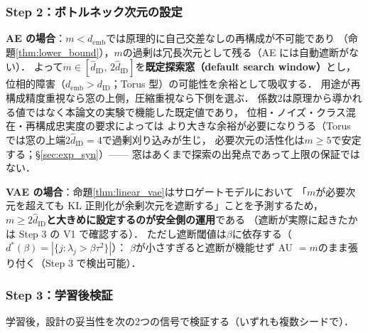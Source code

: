 \documentclass[11pt,a4paper]{jsarticle}
\newcommand{\dID}{d_{\mathrm{ID}}}
\newcommand{\hatdID}{\hat{d}_{\mathrm{ID}}}
\newcommand{\demb}{d_{\mathrm{emb}}}
\newcommand{\dstar}{d^{*}(\beta)}
\begin{document}
\subsubsection{Step 2：ボトルネック次元の設定}\label{sec:protocol_s2}

\textbf{AE の場合}：$m < \demb$では原理的に自己交差なしの再構成が不可能であり
（命題\ref{thm:lower_bound}），$m$の過剰は冗長次元として残る（AE には自動遮断がない）．
よって$m \in [\hatdID,\, 2\hatdID]$を\textbf{既定探索窓（default search window）}とし，
位相的障害（$\demb > \dID$；Torus 型）の可能性を余裕として吸収する．
用途が再構成精度重視なら窓の上側，圧縮重視なら下側を選ぶ．
係数2は原理から導かれる値ではなく本論文の実験で機能した既定値であり，
位相・ノイズ・クラス混在・再構成忠実度の要求によっては
より大きな余裕が必要になりうる（Torus では窓の上端$2\hatdID = 4$で過剰刈り込みが生じ，
必要次元の活性化は$m \geq 5$で安定する；§\ref{sec:exp_syn}）——
窓はあくまで探索の出発点であって上限の保証ではない．

\textbf{VAE の場合}：命題\ref{thm:linear_vae}はサロゲートモデルにおいて
「$m$が必要次元を超えても KL 正則化が余剰次元を遮断する」ことを予測するため，
\textbf{$m \geq 2\hatdID$と大きめに設定するのが安全側の運用}である
（遮断が実際に起きたかは Step 3 の V1 で確認する）．
ただし遮断閾値は$\beta$に依存する（$\dstar = |\{j : \lambda_j > \beta\tau^2\}|$）：
$\beta$が小さすぎると遮断が機能せず AU $= m$のまま張り付く（Step 3 で検出可能）．

\subsubsection{Step 3：学習後検証}\label{sec:protocol_s3}

学習後，設計の妥当性を次の2つの信号で検証する（いずれも複数シードで）．
\end{document}
